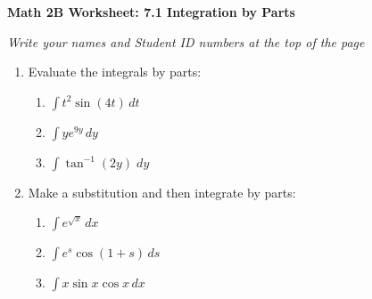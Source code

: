 \documentclass[12pt,fleqn]{article}
\begin{document}
\begin{center}
	\textbf{Math 2B Worksheet: 7.1 Integration by Parts}
\end{center}

\emph{Write your names and Student ID numbers at the top of the page}

\begin{enumerate}
\item Evaluate the integrals by parts:
\begin{enumerate}
\item $\displaystyle\int t^2\sin(4t)\,dt$\vfill

\item $\displaystyle\int ye^{9y}\,dy$\vfill


\item $\displaystyle\int\tan^{-1}(2y)\;dy$\vfill
\end{enumerate}

\newpage

\item Make a substitution and then integrate by parts:
\begin{enumerate}

\item $\displaystyle\int e^{\sqrt{x}}\,dx$\vfill


\item $\displaystyle\int e^s\cos(1+s)\,ds$\vfill


\item $\displaystyle\int x\sin x\cos x\,dx$\vfill
\end{enumerate}
\end{enumerate}
\end{document}
